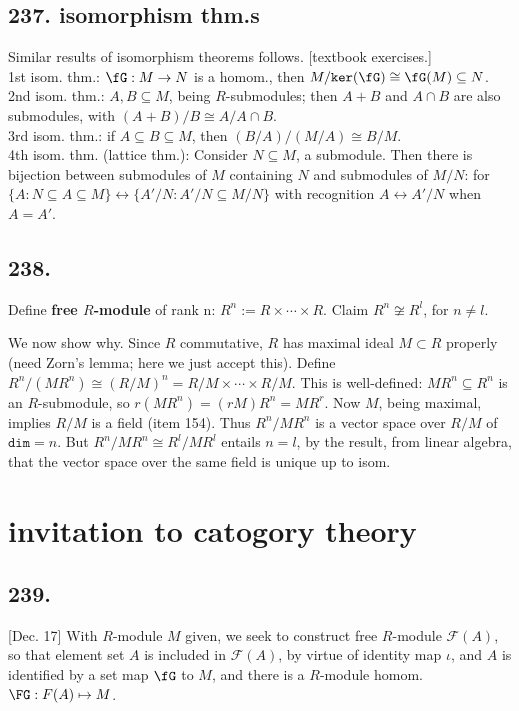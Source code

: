 \documentclass[12pt]{article}
\newcommand{\X}\times%
\newcommand{\Ar}\rightarrow%
\newcommand{\Mp}\mapsto%
\newcommand{\CF}[1]{ \mathcal{#1} }%
\newcommand{\Ss}[1]{\textsf{\bfseries{#1}}}%
\newcommand{\Tw}[1]{\texttt{#1}}%
\newcommand{\Nl}{\\ \indent} %
\begin{document}
\subsection*{237. isomorphism thm.s} Similar results of isomorphism theorems follows. [textbook exercises.] \Nl
1st isom. thm.: \(\fG: M \Ar N\) is a homom., then \(M/ \Tw{ker}(\fG) \cong \fG(M) \subseteq N\). \Nl
2nd isom. thm.: \(A,B \subseteq M\), being \(R\)-submodules; then \(A+B\) and \(A \cap B\) are also submodules, with \((A+B)/B \cong A/ A\cap B\). \Nl
3rd isom. thm.: if \(A \subseteq B \subseteq M\), then \((B/A)/(M/A) \cong B/M\). \Nl
4th isom. thm. (lattice thm.): Consider \(N \subseteq M\), a submodule. Then there is bijection between submodules of \(M\) containing \(N\) and submodules of \(M/N\): 
for \(\{A: N \subseteq A \subseteq M\} \leftrightarrow \{A'/N: A'/N \subseteq M/N\}\) with recognition \(A \leftrightarrow A'/N\) when \(A=A'\). 

\subsection*{238.} Define \Ss{free \(R\)-module} of rank n: \(R^n := R \X\dotsb\X R\). 
Claim \(R^n \not\cong R^l\), for \(n \neq l\). \par
We now show why. Since \(R\) commutative, \(R\) has maximal ideal \(M \subset R\) properly (need Zorn's lemma; here we just accept this). 
Define \(R^n /(MR^n) \cong (R/M)^n =R/M \X\dotsb\X R/M\). 
This is well-defined: \(M R^n \subseteq R^n\) is an \(R\)-submodule, so \(r(MR^n) =(rM)R^n =MR^r\). 
Now \(M\), being maximal, implies \(R/M\) is a field (item 154). 
Thus \(R^n /MR^n\) is a vector space over \(R/M\) of \(\Tw{dim} =n\). 
But \(R^n /MR^n \cong R^l /MR^l\) entails \(n=l\), by the result, from linear algebra, that the vector space over the same field is unique up to isom. 

\section{invitation to catogory theory}
\subsection*{239.} [Dec. 17] With \(R\)-module \(M\) given, we seek to construct free \(R\)-module \(\CF{F}(A)\), 
so that element set \(A\) is included in \(\CF{F}(A)\), by virtue of identity map \(\iota\), 
and \(A\) is identified by a set map \(\fG\) to \(M\), 
and there is a \(R\)-module homom.\ \(\FG: F(A) \Mp M\). 
\end{document}

